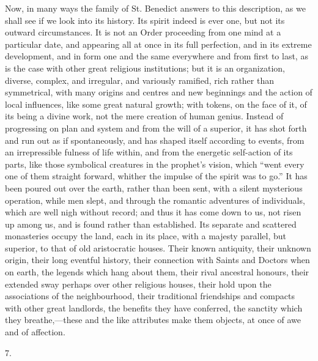Now, in many ways the family of St. Benedict answers to this
description, as we shall see if we look into its history. Its spirit
indeed is ever one, but not its outward circumstances. It is not an
Order proceeding from one mind at a particular date, and appearing all
at once in its full perfection, and in its extreme development, and in
form one and the same everywhere and from first to last, as is the
case with other great religious institutions; but it is an
organization, diverse, complex, and irregular, and variously ramified,
rich rather than symmetrical, with many origins and centres and new
beginnings and the action of local influences, like some great natural
growth; with tokens, on the face of it, of its being a divine work,
not the mere creation of human genius. Instead of progressing on plan
and system and from the will of a superior, it has shot forth and run
out as if spontaneously, and has shaped itself according to events,
from an irrepressible fulness of life within, and from the energetic
self-action of its parts, like those symbolical creatures in the
prophet's vision, which ``went every one of them straight forward,
whither the impulse of the spirit was to go.'' It has been poured
out over the earth, rather than been sent, with a silent mysterious
operation, while men slept, and through the romantic adventures of
individuals, which are well nigh without record; and thus it has come
down to us, not risen up among us, and is found rather than
established. Its separate and scattered monasteries occupy the land,
each in its place, with a majesty parallel, but superior, to
that of old aristocratic houses. Their known antiquity, their unknown
origin, their long eventful history, their connection with Saints and
Doctors when on earth, the legends which hang about them, their rival
ancestral honours, their extended sway perhaps over other religious
houses, their hold upon the associations of the neighbourhood, their
traditional friendships and compacts with other great landlords, the
benefits they have conferred, the sanctity which they breathe,—these
and the like attributes make them objects, at once of awe and of
affection.

7.

